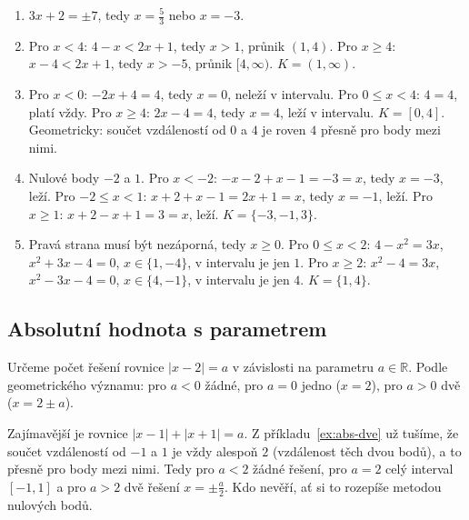 \begin{solution}
  \begin{enumerate}[label=(\alph*)]
    \item $3x + 2 = \pm 7$, tedy $x = \frac{5}{3}$ nebo $x = -3$.
    \item Pro $x < 4$: $4 - x < 2x + 1$, tedy $x > 1$, průnik $(1, 4)$. Pro $x\geq 4$: $x - 4 < 2x + 1$, tedy $x > -5$, průnik $[4, \infty)$. $K = (1, \infty)$.
    \item Pro $x < 0$: $-2x + 4 = 4$, tedy $x = 0$, neleží v intervalu. Pro $0\leq x < 4$: $4 = 4$, platí vždy. Pro $x\geq 4$: $2x - 4 = 4$, tedy $x = 4$, leží v intervalu. $K = [0, 4]$. Geometricky: součet vzdáleností od $0$ a $4$ je roven $4$ přesně pro body mezi nimi.
    \item Nulové body $-2$ a $1$. Pro $x < -2$: $-x - 2 + x - 1 = -3 = x$, tedy $x = -3$, leží. Pro $-2\leq x < 1$: $x + 2 + x - 1 = 2x + 1 = x$, tedy $x = -1$, leží. Pro $x\geq 1$: $x + 2 - x + 1 = 3 = x$, leží. $K = \{-3, -1, 3\}$.
    \item Pravá strana musí být nezáporná, tedy $x\geq 0$. Pro $0\leq x < 2$: $4 - x^2 = 3x$, $x^2 + 3x - 4 = 0$, $x\in\{1, -4\}$, v intervalu je jen $1$. Pro $x\geq 2$: $x^2 - 4 = 3x$, $x^2 - 3x - 4 = 0$, $x\in\{4, -1\}$, v intervalu je jen $4$. $K = \{1, 4\}$.
  \end{enumerate}
\end{solution}

\subsection{Absolutní hodnota s parametrem}

\begin{example}
  Určeme počet řešení rovnice $|x - 2| = a$ v závislosti na parametru $a\in\mathbb{R}$. Podle geometrického významu: pro $a < 0$ žádné, pro $a = 0$ jedno ($x = 2$), pro $a > 0$ dvě ($x = 2\pm a$).

  Zajímavější je rovnice $|x - 1| + |x + 1| = a$. Z příkladu~\ref{ex:abs-dve} už tušíme, že součet vzdáleností od $-1$ a $1$ je vždy alespoň $2$ (vzdálenost těch dvou bodů), a to přesně pro body mezi nimi. Tedy pro $a < 2$ žádné řešení, pro $a = 2$ celý interval $[-1, 1]$ a pro $a > 2$ dvě řešení $x = \pm\frac{a}{2}$. Kdo nevěří, ať si to rozepíše metodou nulových bodů.
\end{example}

